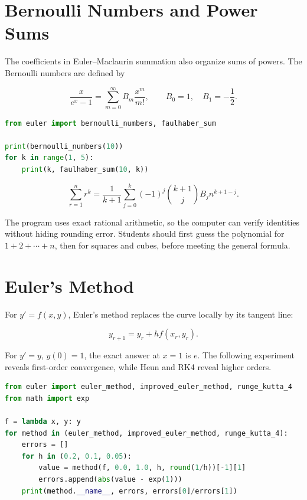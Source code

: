 \section{Bernoulli Numbers and Power Sums}

The coefficients in Euler--Maclaurin summation also organize sums of powers. The
Bernoulli numbers are defined by

\[
\frac{x}{e^x-1}=\sum_{m=0}^{\infty}B_m\frac{x^m}{m!},
\qquad B_0=1,\quad B_1=-\frac12.
\]

\begin{lstlisting}[language=Python]
from euler import bernoulli_numbers, faulhaber_sum

print(bernoulli_numbers(10))
for k in range(1, 5):
    print(k, faulhaber_sum(10, k))
\end{lstlisting}

\begin{theorem}
\[
\sum_{r=1}^{n}r^k=\frac{1}{k+1}\sum_{j=0}^{k}(-1)^j
\binom{k+1}{j}B_j n^{k+1-j}.
\]
\end{theorem}

The program uses exact rational arithmetic, so the computer can verify identities
without hiding rounding error. Students should first guess the polynomial for
$1+2+\cdots+n$, then for squares and cubes, before meeting the general formula.

\section{Euler's Method}

For $y'=f(x,y)$, Euler's method replaces the curve locally by its tangent line:

\[
y_{r+1}=y_r+h f(x_r,y_r).
\]

For $y'=y$, $y(0)=1$, the exact answer at $x=1$ is $e$. The following experiment
reveals first-order convergence, while Heun and RK4 reveal higher orders.

\begin{lstlisting}[language=Python]
from euler import euler_method, improved_euler_method, runge_kutta_4
from math import exp

f = lambda x, y: y
for method in (euler_method, improved_euler_method, runge_kutta_4):
    errors = []
    for h in (0.2, 0.1, 0.05):
        value = method(f, 0.0, 1.0, h, round(1/h))[-1][1]
        errors.append(abs(value - exp(1)))
    print(method.__name__, errors, errors[0]/errors[1])
\end{lstlisting}

